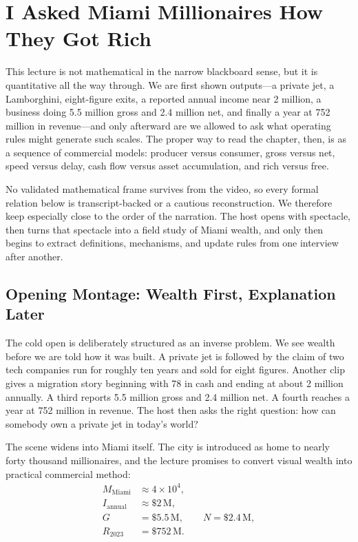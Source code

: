 \chapter{I Asked Miami Millionaires How They Got Rich}

This lecture is not mathematical in the narrow blackboard sense, but it is quantitative all the way through. We are first shown outputs---a private jet, a Lamborghini, eight-figure exits, a reported annual income near \text{\$}2 million, a business doing \text{\$}5.5 million gross and \text{\$}2.4 million net, and finally a year at \text{\$}752 million in revenue---and only afterward are we allowed to ask what operating rules might generate such scales. The proper way to read the chapter, then, is as a sequence of commercial models: producer versus consumer, gross versus net, speed versus delay, cash flow versus asset accumulation, and rich versus free.

No validated mathematical frame survives from the video, so every formal relation below is transcript-backed or a cautious reconstruction. We therefore keep especially close to the order of the narration. The host opens with spectacle, then turns that spectacle into a field study of Miami wealth, and only then begins to extract definitions, mechanisms, and update rules from one interview after another.

\section{Opening Montage: Wealth First, Explanation Later}

The cold open is deliberately structured as an inverse problem. We see wealth before we are told how it was built. A private jet is followed by the claim of two tech companies run for roughly ten years and sold for eight figures. Another clip gives a migration story beginning with \text{\$}78 in cash and ending at about \text{\$}2 million annually. A third reports \text{\$}5.5 million gross and \text{\$}2.4 million net. A fourth reaches a year at \text{\$}752 million in revenue. The host then asks the right question: how can somebody own a private jet in today's world?

The scene widens into Miami itself. The city is introduced as home to nearly forty thousand millionaires, and the lecture promises to convert visual wealth into practical commercial method:
\begin{align}
M_{\mathrm{Miami}} &\approx 4\times 10^4,\\
I_{\mathrm{annual}} &\approx \text{\$}2\,\mathrm{M},\\
G &= \text{\$}5.5\,\mathrm{M}, \qquad N = \text{\$}2.4\,\mathrm{M},\\
R_{2023} &= \text{\$}752\,\mathrm{M}.
\end{align}


